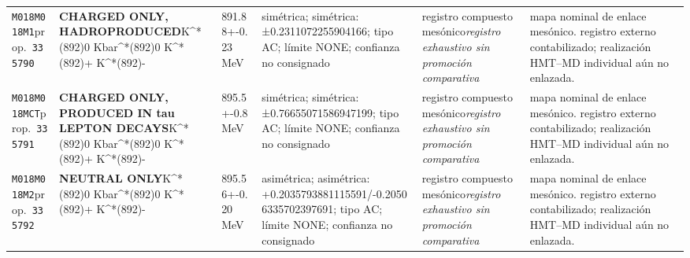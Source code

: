 \begin{landscape}
\begin{longtable}{L{1.85cm}L{4.45cm}L{2.35cm}L{4.05cm}L{3.35cm}L{7.15cm}}
\texttt{M018}\newline \texttt{M018M1}\newline prop.\ \texttt{335790} & \textbf{CHARGED ONLY, HADROPRODUCED}\newline K\textasciicircum{}*(892)0 \textbar{}\allowbreak{} Kbar\textasciicircum{}*(892)0 \textbar{}\allowbreak{} K\textasciicircum{}*(892)+ \textbar{}\allowbreak{} K\textasciicircum{}*(892)- & 891.88+-0.23\,MeV & simétrica; simétrica: ±0.2311072255904166; tipo AC; límite NONE; confianza no consignado & registro compuesto mesónico\newline \emph{registro exhaustivo sin promoción comparativa} & mapa nominal de enlace mesónico. registro externo contabilizado; realización HMT--MD individual aún no enlazada. \\
\texttt{M018}\newline \texttt{M018MCT}\newline prop.\ \texttt{335791} & \textbf{CHARGED ONLY, PRODUCED IN tau LEPTON DECAYS}\newline K\textasciicircum{}*(892)0 \textbar{}\allowbreak{} Kbar\textasciicircum{}*(892)0 \textbar{}\allowbreak{} K\textasciicircum{}*(892)+ \textbar{}\allowbreak{} K\textasciicircum{}*(892)- & 895.5+-0.8\,MeV & simétrica; simétrica: ±0.76655071586947199; tipo AC; límite NONE; confianza no consignado & registro compuesto mesónico\newline \emph{registro exhaustivo sin promoción comparativa} & mapa nominal de enlace mesónico. registro externo contabilizado; realización HMT--MD individual aún no enlazada. \\
\texttt{M018}\newline \texttt{M018M2}\newline prop.\ \texttt{335792} & \textbf{NEUTRAL ONLY}\newline K\textasciicircum{}*(892)0 \textbar{}\allowbreak{} Kbar\textasciicircum{}*(892)0 \textbar{}\allowbreak{} K\textasciicircum{}*(892)+ \textbar{}\allowbreak{} K\textasciicircum{}*(892)- & 895.56+-0.20\,MeV & asimétrica; asimétrica: +0.2035793881115591/-0.20506335702397691; tipo AC; límite NONE; confianza no consignado & registro compuesto mesónico\newline \emph{registro exhaustivo sin promoción comparativa} & mapa nominal de enlace mesónico. registro externo contabilizado; realización HMT--MD individual aún no enlazada. \\

\end{longtable}
\end{landscape}
